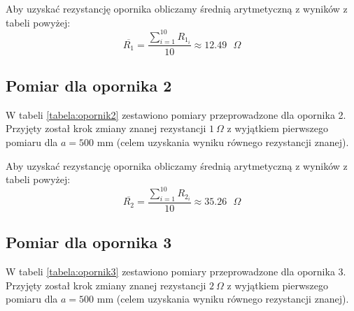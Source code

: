 \documentclass[a4paper,12pts]{article}
\begin{document}
Aby uzyskać rezystancję opornika obliczamy średnią arytmetyczną z wyników z tabeli powyżej:
\begin{equation}
\overline{R_1} = \frac{\sum_{i = 1}^{10} R_{1_i}}{10} \approx 12.49 \textrm{ $\Omega$}
\end{equation}


\subsection{Pomiar dla opornika 2}
W tabeli \ref{tabela:opornik2} zestawiono pomiary przeprowadzone dla opornika 2. Przyjęty został krok zmiany znanej rezystancji $1 ~\Omega$ z wyjątkiem pierwszego pomiaru dla $a = 500$ mm (celem uzyskania wyniku równego rezystancji znanej).

\begin{table}[!h]
	\centering
	\caption{Wyniki pomiarów dla opornika nr 2}
	\label{tabela:opornik2}
\end{table}

Aby uzyskać rezystancję opornika obliczamy średnią arytmetyczną z wyników z tabeli powyżej:
\begin{equation}
\overline{R_2} = \frac{\sum_{i = 1}^{10} R_{2_i}}{10} \approx 35.26 \textrm{ $\Omega$}
\end{equation}

\newpage
\subsection{Pomiar dla opornika 3}
W tabeli \ref{tabela:opornik3} zestawiono pomiary przeprowadzone dla opornika 3. Przyjęty został krok zmiany znanej rezystancji $2 ~\Omega$ z wyjątkiem pierwszego pomiaru dla $a = 500$ mm (celem uzyskania wyniku równego rezystancji znanej).
\end{document}
